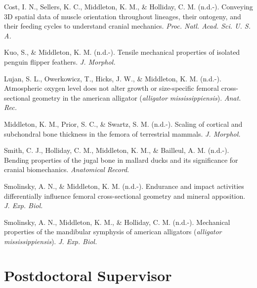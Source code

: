 \documentclass[11pt, a4paper]{awesome-cv}
\begin{document}
\begingroup
\setlength{\parindent}{-0.5in}
\setlength{\leftskip}{0.5in}

\hypertarget{refs_inprep}{}
\leavevmode\hypertarget{ref-Cost_undated-cr}{}%
Cost, I. N., Sellers, K. C., Middleton, K. M., \& Holliday, C. M.
(n.d.-). Conveying 3D spatial data of muscle orientation throughout
lineages, their ontogeny, and their feeding cycles to understand cranial
mechanics. \emph{Proc. Natl. Acad. Sci. U. S. A.}

\leavevmode\hypertarget{ref-kuo_tensile_inreview}{}%
Kuo, S., \& Middleton, K. M. (n.d.-). Tensile mechanical properties of
isolated penguin flipper feathers. \emph{J. Morphol.}

\leavevmode\hypertarget{ref-Lujan_undated-rq}{}%
Lujan, S. L., Owerkowicz, T., Hicks, J. W., \& Middleton, K. M. (n.d.-).
Atmospheric oxygen level does not alter growth or size-specific femoral
cross-sectional geometry in the american alligator (\emph{alligator
mississippiensis}). \emph{Anat. Rec.}

\leavevmode\hypertarget{ref-Middleton_undated-dc}{}%
Middleton, K. M., Prior, S. C., \& Swartz, S. M. (n.d.-). Scaling of
cortical and subchondral bone thickness in the femora of terrestrial
mammals. \emph{J. Morphol.}

\leavevmode\hypertarget{ref-Smith_undated-hm}{}%
Smith, C. J., Holliday, C. M., Middleton, K. M., \& Bailleul, A. M.
(n.d.-). Bending properties of the jugal bone in mallard ducks and its
significance for cranial biomechanics. \emph{Anatomical Record}.

\leavevmode\hypertarget{ref-Smolinsky_undated-uh}{}%
Smolinsky, A. N., \& Middleton, K. M. (n.d.-). Endurance and impact
activities differentially influence femoral cross-sectional geometry and
mineral apposition. \emph{J. Exp. Biol.}

\leavevmode\hypertarget{ref-smolinsky_mechanical_inpreparation}{}%
Smolinsky, A. N., Middleton, K. M., \& Holliday, C. M. (n.d.-).
Mechanical properties of the mandibular symphysis of american alligators
(\emph{alligator mississippiensis}). \emph{J. Exp. Biol.}

\endgroup

\hypertarget{postdoctoral-supervisor}{%
\section{Postdoctoral Supervisor}\label{postdoctoral-supervisor}}

\begin{cventries}
    \vspace{-4.0mm}
\end{cventries}
\end{document}

